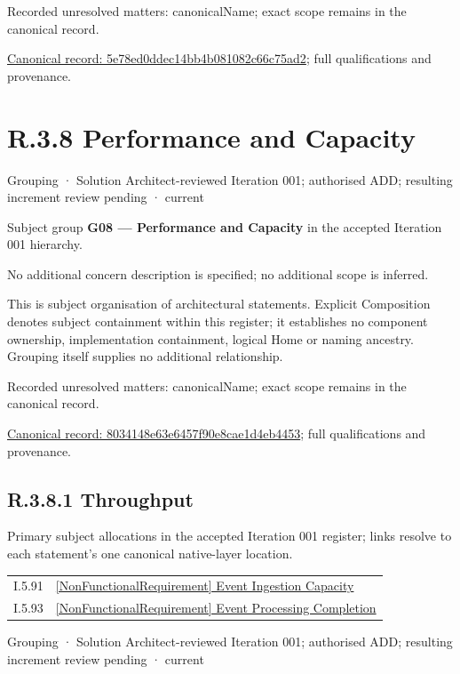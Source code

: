 {\small Recorded unresolved matters: canonicalName; exact scope remains in the canonical record.}\par
{\footnotesize \href{../../../../continuum/grouping/5e78ed0ddec14bb4b081082c66c75ad2.md}{Canonical record: 5e78ed0ddec14bb4b081082c66c75ad2}; full qualifications and provenance.}\par
\section*{R.3.8 Performance and Capacity}
\label{navigation:R.3.8}

\label{element:8034148e63e6457f90e8cae1d4eb4453}
{\small Grouping · Solution Architect-reviewed Iteration 001; authorised ADD; resulting increment review pending · current}\par

Subject group \textbf{G08 — Performance and Capacity} in the accepted Iteration 001 hierarchy.



No additional concern description is specified; no additional scope is inferred.



This is subject organisation of architectural statements. Explicit Composition denotes subject containment within this register; it establishes no component ownership, implementation containment, logical Home or naming ancestry. Grouping itself supplies no additional relationship.


{\small Recorded unresolved matters: canonicalName; exact scope remains in the canonical record.}\par
{\footnotesize \href{../../../../continuum/grouping/8034148e63e6457f90e8cae1d4eb4453.md}{Canonical record: 8034148e63e6457f90e8cae1d4eb4453}; full qualifications and provenance.}\par
\subsection*{R.3.8.1 Throughput}
\label{navigation:R.3.8.1}

Primary subject allocations in the accepted Iteration 001 register; links resolve to each statement’s one canonical native-layer location.\par
\begin{longtable}{p{.22\linewidth}p{.73\linewidth}}
I.5.91 & \hyperref[element:75420022c1a7463e91ca48f229a78194]{[NonFunctionalRequirement] Event Ingestion Capacity} \\
I.5.93 & \hyperref[element:d1380eec700a492b810354e0798c8146]{[NonFunctionalRequirement] Event Processing Completion} \\
\end{longtable}
\label{element:cdcfbe8d106844109bb8ded51dea7a8a}
{\small Grouping · Solution Architect-reviewed Iteration 001; authorised ADD; resulting increment review pending · current}\par


